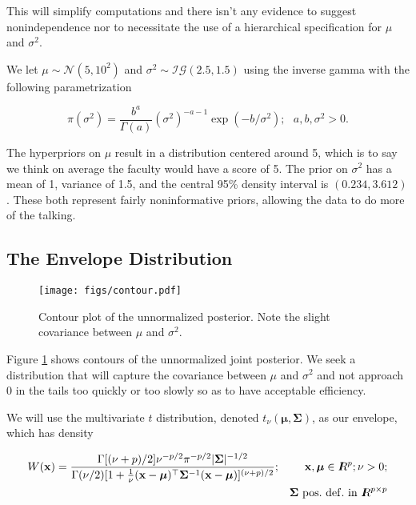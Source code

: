 \documentclass[12pt]{article}
\newcommand{\m}[1]{\mathbf{\bm{#1}}}
\newcommand{\R}{I\hspace{-4.4pt}R}
\begin{document}
\noindent This will simplify computations and there isn't any evidence to suggest nonindependence nor to necessitate the use of a hierarchical specification for $\mu$ and $\sigma^2$.
\bigskip

\noindent We let $\mu\sim\mathcal{N}(5, 10^2)$ and $\sigma^2\sim\mathcal{IG}(2.5, 1.5)$ using the inverse gamma with the following parametrization

\[ \pi(\sigma^2) = \frac{b^a}{\Gamma(a)}(\sigma^2)^{-a-1}\exp(-b/\sigma^2);~~~ a,b,\sigma^2>0. \]

\noindent The hyperpriors on $\mu$ result in a distribution centered around 5, which is to say we think on average the faculty would have a score of 5. The prior on $\sigma^2$ has a mean of 1, variance of 1.5, and the central 95\% density interval is $(0.234, 3.612)$. These both represent fairly noninformative priors, allowing the data to do more of the talking.

\subsection{The Envelope Distribution}

\begin{figure}
    \begin{center}
    \texttt{[image: figs/contour.pdf]}
    \end{center}
    \caption{Contour plot of the unnormalized posterior. Note the slight covariance between $\mu$ and $\sigma^2$.}
    \label{contour}
\end{figure}


\noindent Figure \ref{contour} shows contours of the unnormalized joint posterior. We seek a distribution that will capture the covariance between $\mu$ and $\sigma^2$ and not approach $0$ in the tails too quickly or too slowly so as to have acceptable efficiency.
\bigskip

\noindent We will use the multivariate $t$ distribution, denoted $t_\nu(\m{\mu}, \m{\Sigma})$, as our envelope, which has density

\begin{eqnarray*}
W(\m{x}) = \frac{\Gamma[(\nu+p)/2]\nu^{-p/2}\pi^{-p/2}|\m{\Sigma}|^{-1/2}}{\Gamma(\nu/2)[1+\frac{1}{\nu}(\m{x}-\m{\mu})^\top\m{\Sigma}^{-1}(\m{x}-\m{\mu})]^{(\nu+p)/2}}; && \m{x}, \m{\mu} \in \R^p; \nu>0; \\
&& \m{\Sigma}~\mathrm{pos.~def.~in~} \R^{p\times p}
\end{eqnarray*}
\end{document}
